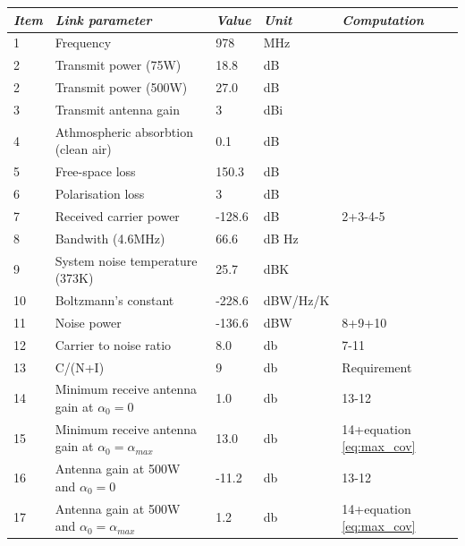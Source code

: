 \begin{center}
 \label{tab:978}
  \begin{tabular}{ l  l  l  l  l}
    \hline
   \textit{Item} & \textit{Link parameter} & \textit{Value} & \textit{Unit} & \textit{Computation} \\ \hline
    1 & Frequency	& 978 & MHz & \\ \hline
    2 & Transmit power (75W) & 18.8 & dB & \\ \hline
    2 & Transmit power (500W) & 27.0 & dB & \\ \hline
    3 & Transmit antenna gain & 3 & dBi & \\ \hline
    4 & Athmospheric absorbtion (clean air) & 0.1 & dB & \\ \hline
    5 & Free-space loss & 150.3 & dB & \\ \hline
    6 & Polarisation loss & 3 & dB & \\ \hline
    7 & Received carrier power & -128.6 & dB & 2+3-4-5\\ \hline
    8 & Bandwith (4.6MHz) & 66.6 & dB Hz & \\ \hline 
    9 & System noise temperature (373K) & 25.7 & dBK& \\ \hline 
    10 & Boltzmann's constant & -228.6 & dBW/Hz/K& \\ \hline 
    11 & Noise power & -136.6 & dBW& 8+9+10\\ \hline 
    12 & Carrier to noise ratio & 8.0 & db & 7-11\\ \hline 
    13 & C/(N+I) & 9 & db & Requirement\\ \hline
    14 & Minimum receive antenna gain at $\alpha_0 = 0 $ & 1.0 & db & 13-12\\ \hline
    15 & Minimum receive antenna gain at $\alpha_0 = \alpha_{max} $ & 13.0 & db & 14+equation \ref{eq:max_cov} \\ \hline
    16 & Antenna gain at 500W and  $\alpha_0 = 0 $  & -11.2 & db & 13-12\\ \hline
    17 & Antenna gain at 500W and $\alpha_0 = \alpha_{max} $ & 1.2 & db & 14+equation \ref{eq:max_cov} \\ \hline 
  \end{tabular}
\end{center}

\iffalse 


